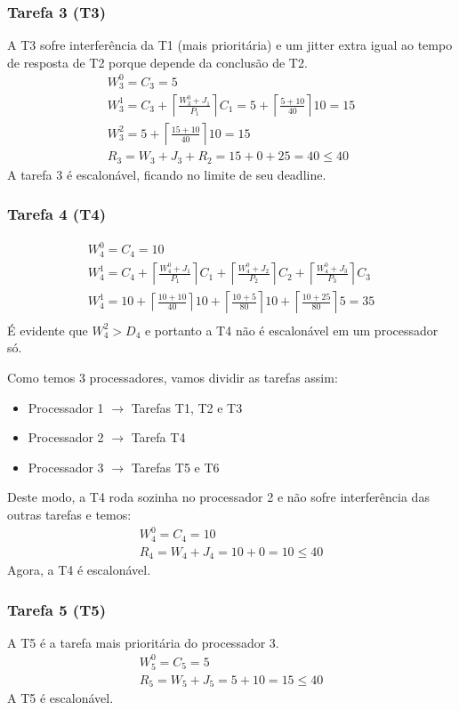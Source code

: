 \documentclass[12pt,a4paper]{article}
\begin{document}
\subsubsection*{Tarefa 3 (T3)}
A T3 sofre interferência da T1 (mais prioritária) e um jitter extra igual ao tempo de resposta de T2 porque depende da conclusão de T2.
\begin{gather*}
W_3^0 = C_3 = 5 \\
W_3^1= C_3 + \left\lceil\frac{W_3^0+J_1}{P_1}\right\rceil C_1 = 5 + \left\lceil\frac{5+10}{40}\right\rceil  10 = 15 \\
W_3^2= 5 + \left\lceil\frac{15+10}{40}\right\rceil  10 = 15\\
R_3=W_3+J_3+R_2=15+0+25=40\leq 40
\end{gather*}
A tarefa 3 é escalonável, ficando no limite de seu deadline.

\subsubsection*{Tarefa 4 (T4)}
\begin{gather*}
W_4^0 = C_4 = 10 \\
W_4^1= C_4 + \left\lceil\frac{W_4^0+J_1}{P_1}\right\rceil C_1 + \left\lceil\frac{W_4^0+J_2}{P_2}\right\rceil C_2 + \left\lceil\frac{W_4^0+J_3}{P_3}\right\rceil C_3 \\
W_4^1= 10 + \left\lceil\frac{10+10}{40}\right\rceil 10 + \left\lceil\frac{10+5}{80}\right\rceil 10 + \left\lceil\frac{10+25}{80}\right\rceil 5 =35\\
\end{gather*}
É evidente que $W_4^2 > D_4$ e portanto a T4 não é escalonável em um processador só. 

Como temos 3 processadores, vamos dividir as tarefas assim:

\begin{itemize}
\item Processador 1 $\rightarrow$ Tarefas T1, T2 e T3
\item Processador 2 $\rightarrow$ Tarefa T4
\item Processador 3 $\rightarrow$ Tarefas T5 e T6
\end{itemize}
Deste modo, a T4 roda sozinha no processador 2 e não sofre interferência das outras tarefas e temos:
\begin{gather*}
W_4^0 = C_4 = 10 \\
R_4=W_4+J_4 = 10+0=10 \leq 40
\end{gather*}
Agora, a T4 é escalonável.
\subsubsection*{Tarefa 5 (T5)}
A T5 é a tarefa mais prioritária do processador 3.
\begin{gather*}
W_5^0 = C_5 = 5 \\
R_5=W_5+J_5 = 5+10=15 \leq 40
\end{gather*}
A T5 é escalonável.
\medskip
\end{document}
